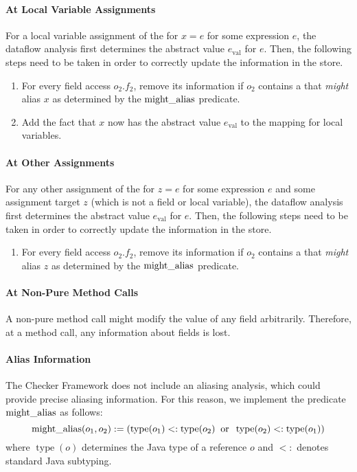 \begin{new}
\paragraph{At Local Variable Assignments}

For a local variable assignment of the for $x = e$ for some expression $e$,
the dataflow analysis first determines the abstract value $e_\text{val}$ for
$e$. Then, the following steps need to be taken in order to correctly update
the information in the store.
\begin{enumerate}
    \item For every field access $o_2.f_2$, remove its information if
    $o_2$ contains a  that \emph{might}
    alias $x$ as determined by the $\operatorname{might\_alias}$
    predicate.
    \item Add the fact that $x$ now has the abstract value $e_\text{val}$
    to the mapping for local variables.
\end{enumerate}

\paragraph{At Other Assignments}

For any other assignment of the for $z = e$ for some expression $e$ and some
assignment target $z$ (which is not a field or local variable),
the dataflow analysis first determines the abstract value $e_\text{val}$ for
$e$. Then, the following steps need to be taken in order to correctly update
the information in the store.
\begin{enumerate}
    \item For every field access $o_2.f_2$, remove its information if
    $o_2$ contains a  that \emph{might}
    alias $z$ as determined by the $\operatorname{might\_alias}$ predicate.
\end{enumerate}


\paragraph{At Non-Pure Method Calls}

A non-pure method call might modify the value of any field arbitrarily.
Therefore, at a method call, any information about fields is lost.


\paragraph{Alias Information}
The Checker Framework does not include an aliasing analysis, which could
provide precise aliasing information.  For this reason, we implement the
predicate $\operatorname{might\_alias}$ as follows:
\[ \operatorname{might\_alias}(o_1,o_2) :=
\left(\operatorname{type}(o_1) <: \operatorname{type}(o_2)
\;\;\text{or}\;\;
\operatorname{type}(o_2) <: \operatorname{type}(o_1) \right) \]
where $\operatorname{type}(o)$ determines the Java type of a reference $o$
and $<:$ denotes standard Java subtyping.

\end{new}











